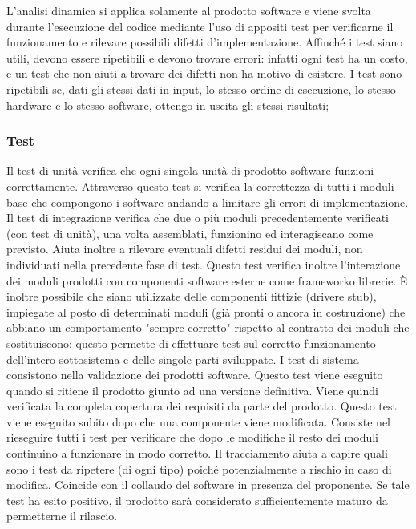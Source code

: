 \documentclass[a4paper,11pt]{article}
\begin{document}
				L'analisi dinamica si applica solamente al prodotto software e viene svolta durante l'esecuzione del codice mediante l'uso di appositi test per verificarne il funzionamento e rilevare possibili difetti d'implementazione. Affinché i test siano utili, devono essere ripetibili e devono trovare errori: infatti ogni test ha un costo, e un test che non aiuti a trovare dei difetti non ha motivo di esistere. I test sono ripetibili se, dati gli stessi dati in input, lo stesso ordine di esecuzione, lo stesso hardware e lo stesso software, ottengo in uscita gli stessi risultati;
				
				\subsubsection{Test}
								
				Il test di unità verifica che ogni singola unità di prodotto software funzioni correttamente.
Attraverso questo test si verifica la correttezza di tutti i moduli base che compongono i software andando
a limitare gli errori di implementazione.
				Il test di integrazione verifica che due o più moduli precedentemente verificati (con test di unità), una volta assemblati, funzionino ed interagiscano come previsto. Aiuta inoltre a rilevare eventuali difetti residui dei moduli, non individuati nella precedente fase di test. Questo test verifica inoltre l'interazione dei moduli prodotti con componenti software esterne come framework\addglos o librerie. È inoltre possibile che siano utilizzate delle componenti fittizie (driver\addglos e stub\addglos), impiegate al posto di determinati moduli (già pronti o ancora in costruzione) che abbiano un comportamento "sempre corretto" rispetto al contratto dei moduli che sostituiscono: questo permette di effettuare test sul corretto funzionamento dell'intero sottosistema e delle singole parti sviluppate.
				I test di sistema consistono nella validazione dei prodotti software. Questo test viene eseguito quando si ritiene il prodotto giunto ad una versione definitiva. Viene quindi verificata la completa copertura dei requisiti da parte del prodotto.
				Questo test viene eseguito subito dopo che una componente viene modificata. Consiste nel rieseguire tutti i test per verificare che dopo le modifiche il resto dei moduli continuino a funzionare in modo corretto. Il tracciamento aiuta a capire quali sono i test da ripetere (di ogni tipo) poiché potenzialmente a rischio in caso di modifica.
				Coincide con il collaudo del software in presenza del proponente. Se tale test ha esito positivo, il prodotto sarà considerato sufficientemente maturo da permetterne il rilascio.
		\pagebreak
\end{document}
